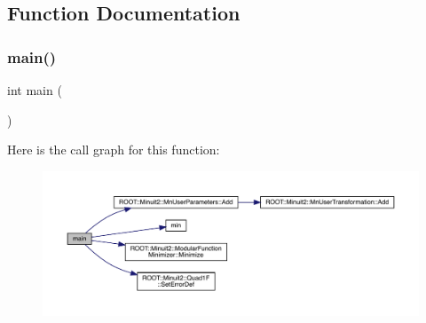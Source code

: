 \subsection{Function Documentation}
\mbox{\label{adat-devel_2other__libs_2minuit_2test_2MnTutorial_2Quad1FMain_8cxx_ae66f6b31b5ad750f1fe042a706a4e3d4}} 
\subsubsection{\texorpdfstring{main()}{main()}}
{\footnotesize\ttfamily int main (\begin{DoxyParamCaption}{ }\end{DoxyParamCaption})}

Here is the call graph for this function\+:
\nopagebreak
\begin{figure}[H]
\begin{center}
\leavevmode
\includegraphics[width=350pt]{df/d56/adat-devel_2other__libs_2minuit_2test_2MnTutorial_2Quad1FMain_8cxx_ae66f6b31b5ad750f1fe042a706a4e3d4_cgraph}
\end{center}
\end{figure}
